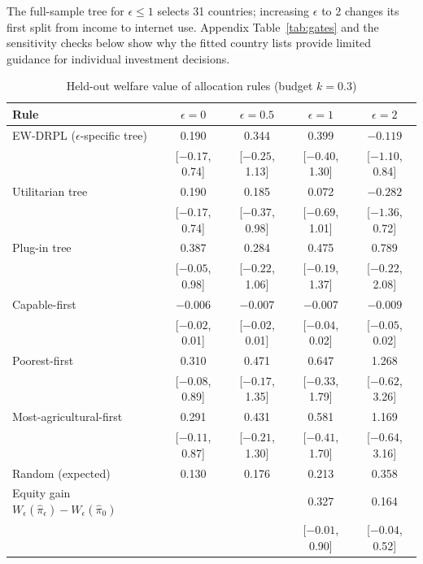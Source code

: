The full-sample tree for $\epsilon\le1$ selects 31 countries; increasing $\epsilon$
to 2 changes its first split from income to internet use. Appendix
Table~\ref{tab:gates} and the sensitivity checks below show why the fitted country
lists provide limited guidance for individual investment decisions.

\begin{table}[t]
\centering
\caption{Held-out welfare value of allocation rules (budget $k=0.3$)}\label{tab:policy}
\small
\begin{tabular}{lcccc}
\toprule
Rule & $\epsilon=0$ & $\epsilon=0.5$ & $\epsilon=1$ & $\epsilon=2$ \\
\midrule
EW-DRPL ($\epsilon$-specific tree) & 0.190 & 0.344 & 0.399 & $-0.119$ \\
 & {\footnotesize[$-0.17$, 0.74]} & {\footnotesize[$-0.25$, 1.13]} & {\footnotesize[$-0.40$, 1.30]} & {\footnotesize[$-1.10$, 0.84]} \\
Utilitarian tree & 0.190 & 0.185 & 0.072 & $-0.282$ \\
 & {\footnotesize[$-0.17$, 0.74]} & {\footnotesize[$-0.37$, 0.98]} & {\footnotesize[$-0.69$, 1.01]} & {\footnotesize[$-1.36$, 0.72]} \\
Plug-in tree & 0.387 & 0.284 & 0.475 & 0.789 \\
 & {\footnotesize[$-0.05$, 0.98]} & {\footnotesize[$-0.22$, 1.06]} & {\footnotesize[$-0.19$, 1.37]} & {\footnotesize[$-0.22$, 2.08]} \\
Capable-first & $-0.006$ & $-0.007$ & $-0.007$ & $-0.009$ \\
 & {\footnotesize[$-0.02$, 0.01]} & {\footnotesize[$-0.02$, 0.01]} & {\footnotesize[$-0.04$, 0.02]} & {\footnotesize[$-0.05$, 0.02]} \\
Poorest-first & 0.310 & 0.471 & 0.647 & 1.268 \\
 & {\footnotesize[$-0.08$, 0.89]} & {\footnotesize[$-0.17$, 1.35]} & {\footnotesize[$-0.33$, 1.79]} & {\footnotesize[$-0.62$, 3.26]} \\
Most-agricultural-first & 0.291 & 0.431 & 0.581 & 1.169 \\
 & {\footnotesize[$-0.11$, 0.87]} & {\footnotesize[$-0.21$, 1.30]} & {\footnotesize[$-0.41$, 1.70]} & {\footnotesize[$-0.64$, 3.16]} \\
Random (expected) & 0.130 & 0.176 & 0.213 & 0.358 \\
\midrule
Equity gain $W_\epsilon(\hat\pi_\epsilon)-W_\epsilon(\hat\pi_0)$ & & & 0.327 & 0.164 \\
 & & & {\footnotesize[$-0.01$, 0.90]} & {\footnotesize[$-0.04$, 0.52]} \\

\end{tabular}
\end{table}
